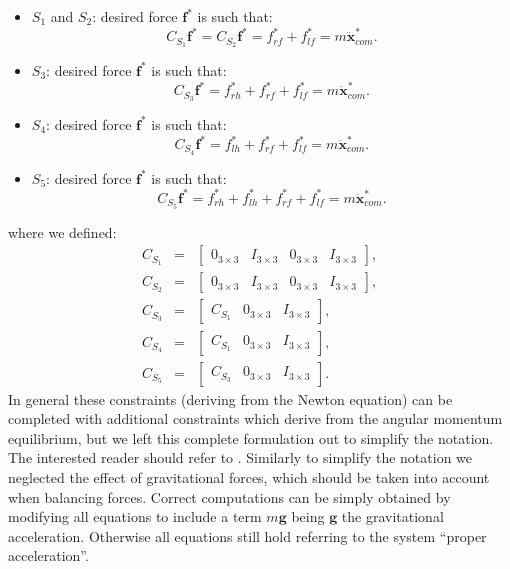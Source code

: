 \documentclass[12pt,a4paper,twoside]{article}
\begin{document}
\begin{itemize}
\item $S_1$ and $S_2$: desired force $\bm f^*$ is such that: 
\begin{equation} C_{S_1} \bm f^* = C_{S_2} \bm f^* = {f}^*_{rf} + {f}^*_{lf} = m \ddot {\bm x}^*_{com}. \label{eq:constraintsS1}\end{equation}
\item $S_3$: desired force $\bm f^*$ is such that:
\begin{equation} C_{S_3} \bm f^* = {f}^*_{rh} + {f}^*_{rf} + {f}^*_{lf} = m \ddot {\bm x}^*_{com}. \label{eq:constraintsS3}\end{equation}
\item $S_4$: desired force $\bm f^*$ is such that: 
\begin{equation} C_{S_4} \bm f^* = {f}^*_{lh} + {f}^*_{rf} + {f}^*_{lf} = m \ddot {\bm x}^*_{com}. \label{eq:constraintsS4}\end{equation}
\item $S_5$: desired force $\bm f^*$ is such that: 
\begin{equation} C_{S_5} \bm f^* = {f}^*_{rh} + {f}^*_{lh} + {f}^*_{rf} + {f}^*_{lf} = m \ddot {\bm x}^*_{com}. \label{eq:constraintsS5}\end{equation}
\end{itemize}
where we defined:
\begin{eqnarray*}
C_{S_1} & = & \begin{bmatrix} 0_{3\times3} & I_{3\times3} & 0_{3\times3} & I_{3\times3} \end{bmatrix}, \\
C_{S_2} & = & \begin{bmatrix} 0_{3\times3} & I_{3\times3} & 0_{3\times3} & I_{3\times3} \end{bmatrix}, \\
C_{S_3} & = & \begin{bmatrix}  C_{S_1} & 0_{3\times3} & I_{3\times3}\end{bmatrix}, \\
C_{S_4} & = & \begin{bmatrix} C_{S_1} & 0_{3\times3} & I_{3\times3}\end{bmatrix}, \\
C_{S_5} & = & \begin{bmatrix} C_{S_3} & 0_{3\times3} & I_{3\times3}\end{bmatrix}. 
\end{eqnarray*}
In general these constraints (deriving from the Newton equation) can be completed with additional constraints which derive from the angular momentum equilibrium, but we left this complete formulation out to simplify the notation. The interested reader should refer to \cite{orin2013}. Similarly to simplify the notation we neglected the effect of gravitational forces, which should be taken into account when balancing forces. Correct computations can be simply obtained by modifying all equations to include a term $m \bm g$ being $\bm g$ the gravitational acceleration. Otherwise all equations still hold referring to the system ``proper acceleration''. 
\end{document}
